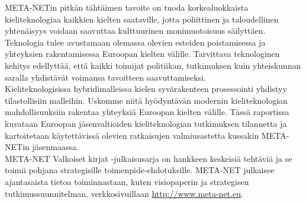 \begin{multicols}{2}

META-NETin pitkän tähtäimen tavoite on tuoda korkealuokkaista
kieliteknologiaa kaikkien kielten saataville, jotta poliittinen ja 
taloudellinen yhtenäisyys voidaan saavuttaa kulttuurinen monimuotoisuus
säilyttäen. Teknologia tulee avustamaan olemassa olevien esteiden
poistamisessa ja yhteyksien rakentamisessa Euroopan kielten
välille. Tarvittava teknologinen kehitys edellyttää, että kaikki
toimijat politiikan, tutkimuksen kuin yhteiskunnan saralla yhdistävät
voimansa tavoitteen saavuttamiseksi.\\
Kieliteknologisissa hybridimalleissa kielen syvärakenteen prosessointi
yhdistyy tilastollisiin malleihin. Uskomme niitä hyödyntävän modernin
kieliteknologian mahdollisuuksiin rakentaa yhteyksiä Euroopan kielten
välille. Tässä raportissa kuvataan Euroopan jäsenvaltioiden
kieliteknologian tutkimuksen tilannetta ja kartoitetaan käytettävissä
olevien ratkaisujen valmiusastetta kussakin META-NETin jäsenmaassa.\\
META-NET Valkoiset kirjat -julkaisusarja on hankkeen keskeisiä tehtäviä ja 
se toimii pohjana strategisille toimenpide-ehdotuksille. META-NET julkaisee 
ajantasaista tietoa toiminnastaan, kuten visiopaperin \cite{Vision} ja 
strategisen tutkimussuunnitelman, verkkosivuillaan \url{http://www.meta-net.eu}.


\end{multicols}

\clearpage


